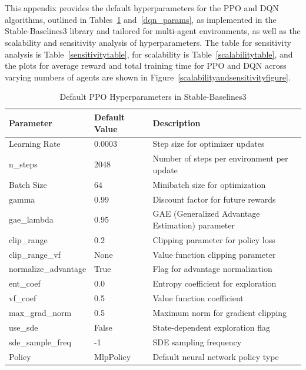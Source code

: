 \documentclass[preprint,12pt]{elsarticle}
\begin{document}
    
\section{}
\label{hyperparameters}

This appendix provides the default hyperparameters for the PPO and DQN algorithms, outlined in Tables~\ref{ppo_params} and~\ref{dqn_params}, as implemented in the Stable-Baselines3 library and tailored for multi-agent environments, as well as the scalability and sensitivity analysis of hyperparameters. The table for sensitivity analysis is Table~\ref{sensitivitytable}, for scalability is Table~\ref{scalabilitytable}, and the plots for average reward and total training time for PPO and DQN across varying numbers of agents are shown in Figure~\ref{scalabilityandsensitivityfigure}.

\begin{table}%
\centering
\begin{tabular}{llp{8cm}}
\hline
\textbf{Parameter} & \textbf{Default Value} & \textbf{Description} \\
\hline
Learning Rate & 0.0003 & Step size for optimizer updates \\

n\_steps & 2048 & Number of steps per environment per update \\

Batch Size & 64 & Minibatch size for optimization \\

gamma & 0.99 & Discount factor for future rewards \\

gae\_lambda & 0.95 & GAE (Generalized Advantage Estimation) parameter \\

clip\_range & 0.2 & Clipping parameter for policy loss \\

clip\_range\_vf & None & Value function clipping parameter \\

normalize\_advantage & True & Flag for advantage normalization \\

ent\_coef & 0.0 & Entropy coefficient for exploration \\

vf\_coef & 0.5 & Value function coefficient \\

max\_grad\_norm & 0.5 & Maximum norm for gradient clipping \\

use\_sde & False & State-dependent exploration flag \\

sde\_sample\_freq & -1 & SDE sampling frequency \\

Policy & MlpPolicy & Default neural network policy type \\
\hline
\end{tabular}
\caption{Default PPO Hyperparameters in Stable-Baselines3}
\label{ppo_params}
\end{table}
\end{document}
